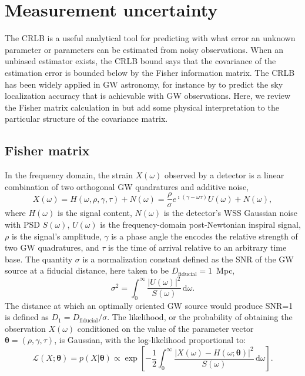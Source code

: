 \documentclass{iopart}
\begin{document}
\section{Measurement uncertainty}

The \ac{CRLB} is a useful analytical tool for predicting with what error an unknown parameter or parameters can be estimated from noisy observations. When an unbiased estimator exists, the \ac{CRLB} bound says that the covariance of the estimation error is bounded below by the Fisher information matrix. The \ac{CRLB} has been widely applied in \ac{GW} astronomy, for instance by \cite{fairhurst:2009} to predict the sky localization accuracy that is achievable with \ac{GW} observations. Here, we review the Fisher matrix calculation in \cite{fairhurst:2009} but add some physical interpretation to the particular structure of the covariance matrix.

\subsection{Fisher matrix}

In the frequency domain, the strain $X (\omega)$ observed by a detector is a linear combination of two orthogonal \ac{GW} quadratures and additive noise,
%
\begin{equation}\label{eq:signal-model}
	X (\omega) = H (\omega, \rho, \gamma, \tau) + N (\omega) = \frac{\rho}{\sigma} e^{\imath (\gamma - \omega \tau)} U (\omega) + N (\omega),
\end{equation}
%
where $H (\omega)$ is the signal content, $N (\omega)$ is the detector's \ac{WSS} Gaussian noise with \ac{PSD} $S(\omega)$, $U (\omega)$ is the frequency-domain post-Newtonian inspiral signal, $\rho$ is the signal's amplitude, $\gamma$ is a phase angle the encodes the relative strength of two \ac{GW} quadratures, and $\tau$ is the time of arrival relative to an arbitrary time base. The quantity $\sigma$ is a normalization constant defined as the \ac{SNR} of the \ac{GW} source at a fiducial distance, here taken to be $D_\mathrm{fiducial} = 1$~Mpc,
%
\begin{equation}\label{eq:sigma}
    \sigma^2 = \int_0^\infty \frac{\left| U (\omega)\right|^2}{S(\omega)} \, \mathrm{d}\omega.
\end{equation}
%
The distance at which an optimally oriented \ac{GW} source would produce \ac{SNR}=1 is defined as $D_1 = D_\mathrm{fiducial} / \sigma$. The likelihood, or the probability of obtaining the observation $X(\omega)$ conditioned on the value of the parameter vector $\boldsymbol\theta = (\rho, \gamma, \tau)$, is Gaussian, with the log-likelihood proportional to:
%
\begin{equation}\label{eq:gaussian-likelihood}
	\mathcal{L}(X; \boldsymbol\theta) = p(X | \boldsymbol\theta)
		\propto \exp \left[
		- \frac{1}{2} \int_0^\infty \frac{\left|X (\omega)
			- H(\omega; \boldsymbol\theta) \right|^2}{S(\omega)} \, \mathrm{d}\omega
	\right].
\end{equation}
\end{document}
